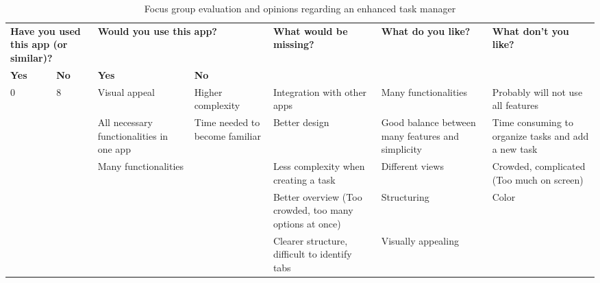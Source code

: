 \FloatBarrier
\begin{table}[!htbp]
    \centering
    \begin{adjustbox}{width=1.2\textwidth,center=\textwidth}
        \begin{tabular}{|l|l|l|l|l|l|l|}
        \hline
        \multicolumn{2}{|l}{\textbf{Have you used this app (or similar)?}} & \multicolumn{2}{|l|}{\textbf{Would you use this app?}} & \multirow{2}{*}{\textbf{What would be missing?}} & \multirow{2}{*}{\textbf{What do you like?}} & \multirow{2}{*}{\textbf{What don't you like?}} \\ \cline{1-4}
        \textbf{Yes} & \textbf{No} & \textbf{Yes} & \textbf{No} & & & \\
        \hline
        \multirow{5}{*}{ 0 } & \multirow{5}{*}{ 8 } & Visual appeal & Higher complexity & Integration with other apps & Many functionalities & Probably will not use all features \\ \cline{3-7}
        & & All necessary functionalities in one app & Time needed to become familiar & Better design & Good balance between many features and simplicity & Time consuming to organize tasks and add a new task \\ \cline{3-7}
        & & Many functionalities & & Less complexity when creating a task & Different views & Crowded, complicated (Too much on screen) \\ \cline{3-7}
        & & & & Better overview (Too crowded, too many options at once) & Structuring & Color \\ \cline{3-7}
        & & & & Clearer structure, difficult to identify tabs & Visually appealing & \\ \hline
        \end{tabular}
    \end{adjustbox}
    \caption{Focus group evaluation and opinions regarding an enhanced task manager}
    \label{tab:enhancedTaskManEval}
\end{table}
\FloatBarrier

